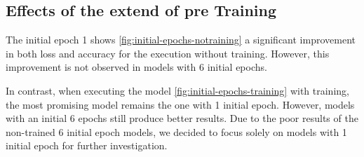 \subsection{Effects of the extend of pre Training}\label{subsec:effects-of-the-extend-of-pre-training}
The initial epoch 1 shows \ref{fig:initial-epochs-notraining} a significant improvement in both loss and accuracy for the execution without training.
However, this improvement is not observed in models with 6 initial epochs.

In contrast, when executing the model \ref{fig:initial-epochs-training} with training, the most promising model remains the one with 1 initial epoch.
However, models with an initial 6 epochs still produce better results.
Due to the poor results of the non-trained 6 initial epoch models, we decided to focus solely on models with 1 initial epoch for further investigation.
